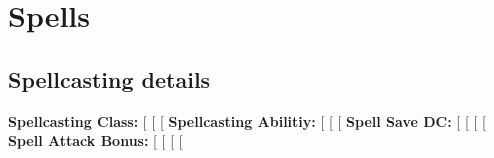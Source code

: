 \section*{Spells}

\subsection*{Spellcasting details}
\textbf{Spellcasting Class:}
[%
[%
[%
\noindent\textbf{Spellcasting Abilitiy:}
[%
[%
[%
\noindent\textbf{Spell Save DC:}
[%
[%
[%
[%
\noindent\textbf{Spell Attack Bonus:}
[%
[%
[%
[%

